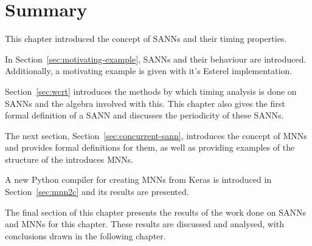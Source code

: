 \section{Summary}
This chapter introduced the concept of \acfp{SANN} and their timing properties.

In Section~\ref{sec:motivating-example}, \acp{SANN} and their behaviour are introduced. 
Additionally, a motivating example is given with it's Esterel implementation.

Section~\ref{sec:wcrt} introduces the methods by which timing analysis is done on \acp{SANN} and the algebra involved with this.
This chapter also gives the first formal definition of a \ac{SANN} and discusses the periodicity of these \acp{SANN}.

The next section, Section~\ref{sec:concurrent-sann}, introduces the concept of \acfp{MNN} and provides formal definitions for them, as well as providing examples of the structure of the introduces \acp{MNN}.

A new Python compiler for creating \acp{MNN} from Keras is introduced in Section~\ref{sec:mnn2c} and its results are presented.

The final section of this chapter presents the results of the work done on \acp{SANN} and \acp{MNN} for this chapter.
These results are discussed and analysed, with conclusions drawn in the following chapter.

